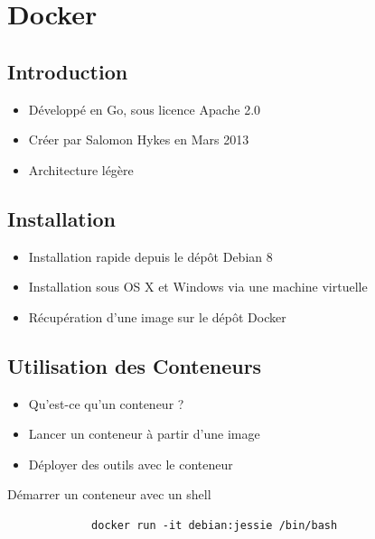 \documentclass{beamer}
\begin{document}
        
    
    
    
    
    
    \section{Docker}
    \subsection{Introduction}
    \begin{frame}
       \begin{itemize}
          \item{Développé en Go, sous licence Apache 2.0}
          \item{Créer par Salomon Hykes en Mars 2013}
          \item{Architecture légère}
       \end{itemize}
    \end{frame}

    \subsection{Installation}
    \begin{frame}
       \begin{itemize}
          \item{Installation rapide depuis le dépôt Debian 8}
          \item{Installation sous OS X et Windows via une machine virtuelle}
          \item{Récupération d'une image sur le dépôt Docker}
       \end{itemize}
    \end{frame}

    \subsection{Utilisation des Conteneurs}
    \begin{frame}[containsverbatim]
       \begin{itemize}
          \item{Qu'est-ce qu'un conteneur ?}
          \item{Lancer un conteneur à partir d'une image}
          \item{Déployer des outils avec le conteneur}
       \end{itemize}
     
       \begin{block}{Démarrer un conteneur avec un shell}
          \begin{verbatim}
             docker run -it debian:jessie /bin/bash
          \end{verbatim}
       \end{block}
    \end{frame}
\end{document}
